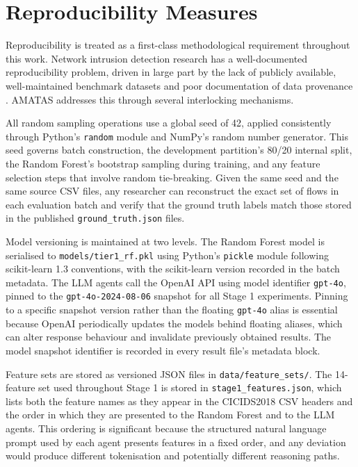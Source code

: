 \documentclass[../main.tex]{subfiles}
\begin{document}
\section{Reproducibility Measures}
\label{sec:reproducibility}

Reproducibility is treated as a first-class methodological requirement throughout this work. Network intrusion detection research has a well-documented reproducibility problem, driven in large part by the lack of publicly available, well-maintained benchmark datasets and poor documentation of data provenance \autocite{Kenyon2020, Ring2019}. AMATAS addresses this through several interlocking mechanisms.

All random sampling operations use a global seed of 42, applied consistently through Python's \texttt{random} module and NumPy's random number generator. This seed governs batch construction, the development partition's 80/20 internal split, the Random Forest's bootstrap sampling during training, and any feature selection steps that involve random tie-breaking. Given the same seed and the same source CSV files, any researcher can reconstruct the exact set of flows in each evaluation batch and verify that the ground truth labels match those stored in the published \texttt{ground\_truth.json} files.

Model versioning is maintained at two levels. The Random Forest model is serialised to \texttt{models/tier1\_rf.pkl} using Python's \texttt{pickle} module following scikit-learn 1.3 conventions, with the scikit-learn version recorded in the batch metadata. The LLM agents call the OpenAI API using model identifier \texttt{gpt-4o}, pinned to the \texttt{gpt-4o-2024-08-06} snapshot for all Stage 1 experiments. Pinning to a specific snapshot version rather than the floating \texttt{gpt-4o} alias is essential because OpenAI periodically updates the models behind floating aliases, which can alter response behaviour and invalidate previously obtained results. The model snapshot identifier is recorded in every result file's metadata block.

Feature sets are stored as versioned JSON files in \texttt{data/feature\_sets/}. The 14-feature set used throughout Stage 1 is stored in \texttt{stage1\_features.json}, which lists both the feature names as they appear in the CICIDS2018 CSV headers and the order in which they are presented to the Random Forest and to the LLM agents. This ordering is significant because the structured natural language prompt used by each agent presents features in a fixed order, and any deviation would produce different tokenisation and potentially different reasoning paths.
\end{document}
